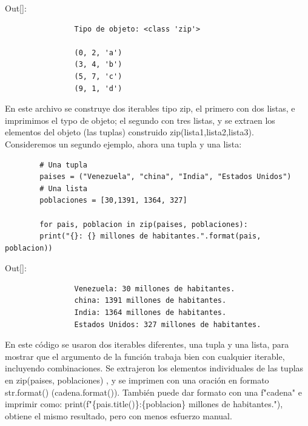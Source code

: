 	{\ttfamily\scriptsize\scriptsize 
		\hspace{-0.65cm}Out[]: \vspace{-0.3cm}	
		{\color{blue} 	
			\begin{verbatim}
				Tipo de objeto: <class 'zip'> 
				
				(0, 2, 'a')
				(3, 4, 'b')
				(5, 7, 'c')
				(9, 1, 'd')
			\end{verbatim}
	}}
	
	En este archivo se construye dos iterables tipo {\ttfamily zip}, el primero con dos listas, e imprimimos el typo de objeto; el segundo con tres listas, y se extraen los elementos del objeto (las tuplas) construido  {\ttfamily zip(lista1,lista2,lista3)}.\\
	
	Consideremos un segundo ejemplo, ahora una tupla y una lista: 
	
	
	\hspace{-2.5cm}{\ttfamily \scriptsize zip\_01.py}  \vspace{-0.5cm}
	\begin{lstlisting}
		# Una tupla
		paises = ("Venezuela", "china", "India", "Estados Unidos")
		# Una lista
		poblaciones = [30,1391, 1364, 327]
		
		for pais, poblacion in zip(paises, poblaciones):
		print("{}: {} millones de habitantes.".format(pais, poblacion))
	\end{lstlisting}
	{\ttfamily\scriptsize\scriptsize \noindent Out[]: \vspace{-0.3cm}	
		{\color{blue} 	
			\begin{verbatim}
				Venezuela: 30 millones de habitantes.
				china: 1391 millones de habitantes.
				India: 1364 millones de habitantes.
				Estados Unidos: 327 millones de habitantes.
			\end{verbatim}
	}}
	
	
	
	En este código se usaron dos iterables diferentes, una tupla y una lista, para mostrar que el argumento de la función trabaja bien con cualquier iterable, incluyendo combinaciones.  Se extrajeron los elementos individuales de las tuplas en 
	{\ttfamily zip(paises, poblaciones) },  y se imprimen con una oración en formato {\ttfamily  str.format()} ({\ttfamily cadena.format()}). También  puede dar formato con una {\ttfamily f{}"{}cadena{}"{}} e imprimir como: {\ttfamily print(f{}"{}\{pais.title()\}:\{poblacion\} millones de habitantes.{}"{})},  obtiene el mismo resultado, pero con menos esfuerzo manual.\\
	
